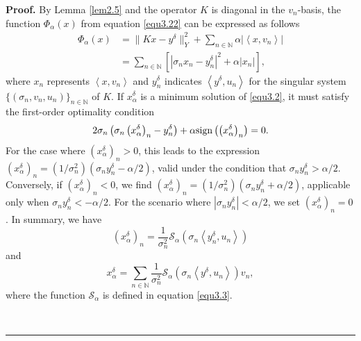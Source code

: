 \documentclass[a4paper,12pt]{article}
\numberwithin{equation}{section}
\newenvironment{proof}[1][Proof]{\textbf{#1.} }
{\ \rule{0.75em}{0.75em}\smallskip}
\begin{document}
\begin{proof}
    By Lemma \ref{lem2.5} and the operator $K$ is diagonal in the $v_{n}$-basis, the function $\Phi_{\alpha}(x)$ from equation \eqref{equ3.22} can be expressed as follows
    \begin{align}\label{equ3.5}
        \Phi_{\alpha}(x)
        & =\|Kx-y^{\delta}\|_{Y}^{2}+\sum_{n\in\mathbb{N}}\alpha|\left<x,v_{n}\right>| \nonumber\\
        & =\sum_{n\in\mathbb{N}}\left[|\sigma_{n}x_{n}-y^{\delta}_{n}|^{2}+\alpha|x_{n}|\right],
    \end{align}
    where $x_{n}$ represents $\left<x,v_{n}\right>$ and $y^{\delta}_{n}$ indicates $\left<y^{\delta},u_{n}\right>$ for the singular system $\{(\sigma_{n},v_{n},u_{n})\}_{n\in\mathbb{N}}$ of $K$. If $x_{\alpha}^{\delta}$ is a minimum solution of \eqref{equ3.2}, it must satisfy the first-order optimality condition
    \begin{equation}\label{equ3.6}
        2\sigma_{n}\left(\sigma_{n}\left(x_{\alpha}^{\delta}\right)_{n}-y^{\delta}_{n}\right)+\alpha{\rm{sign}}\left(\left(x_{\alpha}^{\delta}\right)_{n}\right)=0.
    \end{equation}
    For the case where $\left(x_{\alpha}^{\delta}\right)_{n}>0$, this leads to the expression $\left(x_{\alpha}^{\delta}\right)_{n}=(1/\sigma_{n}^{2})(\sigma_{n}y^{\delta}_{n}-\alpha/2)$, valid under the condition that $\sigma_{n}y^{\delta}_{n} >\alpha/2$. Conversely, if $\left(x_{\alpha}^{\delta}\right)_{n}<0$, we find $\left(x_{\alpha}^{\delta}\right)_{n}=(1/\sigma_{n}^{2})(\sigma_{n}y^{\delta}_{n}+\alpha/2)$, applicable only when $\sigma_{n}y^{\delta}_{n} <-\alpha/2$. For the scenario where $|\sigma_{n}y^{\delta}_{n}| <\alpha/2$, we set $\left(x_{\alpha}^{\delta}\right)_{n}=0$. In summary, we have
    \begin{equation*}
        \left(x_{\alpha}^{\delta}\right)_{n}=\frac{1}{\sigma_{n}^{2}}\mathcal{S}_{\alpha}(\sigma_{n}\left<y^{\delta}_{n}, u_{n}\right>) 
    \end{equation*}
    and
    \begin{equation*}
        x_{\alpha}^{\delta}=\sum_{n\in\mathbb{N}}\frac{1}{\sigma_{n}^{2}}\mathcal{S}_{\alpha}(\sigma_{n}\left<y^{\delta},u_{n}\right>)v_{n}, 
    \end{equation*}
    where the function $\mathcal{S}_{\alpha}$ is defined in equation \eqref{equ3.3}. 
    

\end{proof}
\end{document}
